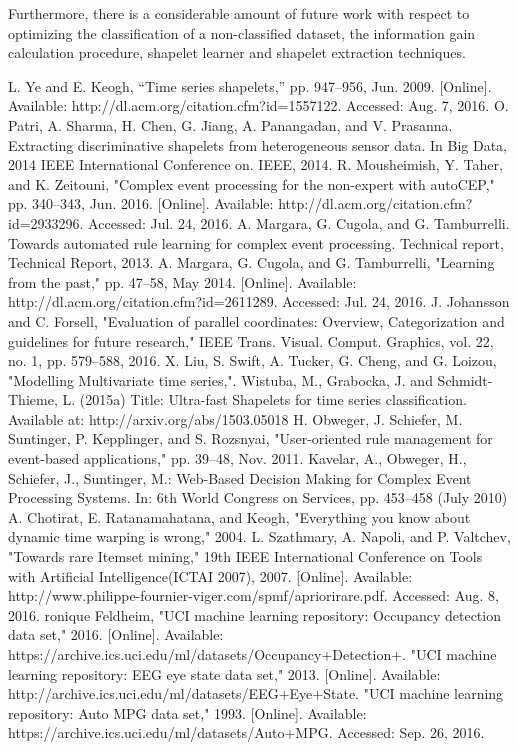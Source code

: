 \documentclass[letterpaper, 10 pt, conference]{IEEEtran}  %
\begin{document}
Furthermore, there is a considerable amount of future work with respect to optimizing the classification of a non-classified dataset, the information gain calculation procedure, shapelet learner and shapelet extraction techniques. 


\begin{thebibliography}{99}

 L. Ye and E. Keogh, “Time series shapelets,” pp. 947–956, Jun. 2009. [Online]. Available: http://dl.acm.org/citation.cfm?id=1557122. Accessed: Aug. 7, 2016.
 O. Patri, A. Sharma, H. Chen, G. Jiang, A. Panangadan, and V. Prasanna. Extracting discriminative shapelets from heterogeneous sensor data. In Big Data, 2014 IEEE International Conference on. IEEE, 2014.
 R. Mousheimish, Y. Taher, and K. Zeitouni, "Complex event processing for the non-expert with autoCEP," pp. 340–343, Jun. 2016. [Online]. Available: http://dl.acm.org/citation.cfm?id=2933296. Accessed: Jul. 24, 2016.
 A. Margara, G. Cugola, and G. Tamburrelli. Towards automated rule learning for complex event processing. Technical report, Technical Report, 2013.
 A. Margara, G. Cugola, and G. Tamburrelli, "Learning from the past," pp. 47–58, May 2014. [Online]. Available: http://dl.acm.org/citation.cfm?id=2611289. Accessed: Jul. 24, 2016.
 J. Johansson and C. Forsell, "Evaluation of parallel coordinates: Overview, Categorization and guidelines for future research," IEEE Trans. Visual. Comput. Graphics, vol. 22, no. 1, pp. 579–588, 2016.
 X. Liu, S. Swift, A. Tucker, G. Cheng, and G. Loizou, "Modelling Multivariate time series,". 
 Wistuba, M., Grabocka, J. and Schmidt-Thieme, L. (2015a) Title: Ultra-fast Shapelets for time series classification. Available at: http://arxiv.org/abs/1503.05018
 H. Obweger, J. Schiefer, M. Suntinger, P. Kepplinger, and S. Rozsnyai, "User-oriented rule management for event-based applications," pp. 39–48, Nov. 2011. 
 Kavelar, A., Obweger, H., Schiefer, J., Suntinger, M.: Web-Based Decision Making for Complex Event Processing Systems. In: 6th World Congress on Services, pp. 453–458 (July 2010)
 A. Chotirat, E. Ratanamahatana, and Keogh, "Everything you know about dynamic time warping is wrong," 2004.
 L. Szathmary, A. Napoli, and P. Valtchev, "Towards rare Itemset mining," 19th IEEE International Conference on Tools with Artificial Intelligence(ICTAI 2007), 2007. [Online]. Available: http://www.philippe-fournier-viger.com/spmf/apriorirare.pdf. Accessed: Aug. 8, 2016.
 ronique Feldheim, "UCI machine learning repository: Occupancy detection data set," 2016. [Online]. Available: https://archive.ics.uci.edu/ml/datasets/Occupancy+Detection+.
 "UCI machine learning repository: EEG eye state data set," 2013. [Online]. Available: http://archive.ics.uci.edu/ml/datasets/EEG+Eye+State.
 "UCI machine learning repository: Auto MPG data set," 1993. [Online]. Available: https://archive.ics.uci.edu/ml/datasets/Auto+MPG. Accessed: Sep. 26, 2016.



\end{thebibliography}
\end{document}
